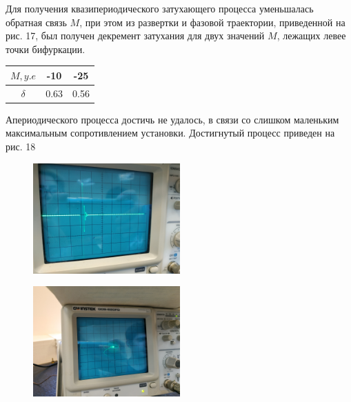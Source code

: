 Для получения квазипериодического затухающего процесса уменьшалась обратная связь $M$, при этом из развертки и фазовой траектории, приведенной на рис. 17, 
был получен декремент затухания для двух значений $M$, лежащих левее точки бифуркации.

\begin{table}[H]
    \centering
    \begin{tabular}{@{}|c|c|c|@{}}
    \hline
        $M, y.e$     & -10 & -25 \\ \hline
    $\delta$ & 0.63 & 0.56 \\ \hline
    \end{tabular}
\end{table}

Апериодического процесса достичь не удалось, в связи со слишком маленьким максимальным сопротивлением установки. Достигнутый процесс приведен на рис. 18
\begin{center}
    \begin{figure}[H]
    \begin{minipage}{.49\linewidth}
        \vspace{-10pt}
        \centering
        \includegraphics[height=120pt]{img/12.jpg} 
        \vspace{0pt}
        \label{fig:10}
        \vspace{-20pt}
    \end{minipage}
    \begin{minipage}{.49\linewidth}
        \vspace{-10pt}
        \centering
        \includegraphics[height=120pt]{img/13.jpg} 
        \vspace{0pt}
        \label{fig:10}
        \vspace{-20pt}
    \end{minipage}
    \end{figure}
\end{center} 
